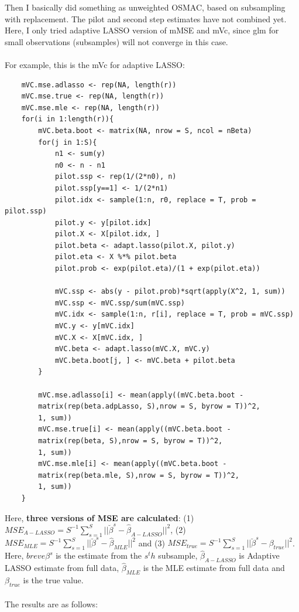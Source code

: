 \documentclass[]{article}
\begin{document}
Then I basically did something as unweighted OSMAC, based on subsampling with replacement. The pilot and second step estimates have not combined yet. Here, I only tried adaptive LASSO version of mMSE and mVc, since glm for small observations (subsamples) will not converge in this case.\\
\\
For example, this is the mVc for adaptive LASSO:\\
\begin{lstlisting}
	mVC.mse.adlasso <- rep(NA, length(r))
	mVC.mse.true <- rep(NA, length(r))
	mVC.mse.mle <- rep(NA, length(r))
	for(i in 1:length(r)){
		mVC.beta.boot <- matrix(NA, nrow = S, ncol = nBeta)
		for(j in 1:S){
			n1 <- sum(y)
			n0 <- n - n1
			pilot.ssp <- rep(1/(2*n0), n)
			pilot.ssp[y==1] <- 1/(2*n1)
			pilot.idx <- sample(1:n, r0, replace = T, prob = pilot.ssp)
			pilot.y <- y[pilot.idx]
			pilot.X <- X[pilot.idx, ]
			pilot.beta <- adapt.lasso(pilot.X, pilot.y)
			pilot.eta <- X %*% pilot.beta
			pilot.prob <- exp(pilot.eta)/(1 + exp(pilot.eta))
			
			mVC.ssp <- abs(y - pilot.prob)*sqrt(apply(X^2, 1, sum))
			mVC.ssp <- mVC.ssp/sum(mVC.ssp)
			mVC.idx <- sample(1:n, r[i], replace = T, prob = mVC.ssp)
			mVC.y <- y[mVC.idx]
			mVC.X <- X[mVC.idx, ]
			mVC.beta <- adapt.lasso(mVC.X, mVC.y)
			mVC.beta.boot[j, ] <- mVC.beta + pilot.beta
		}
		
		mVC.mse.adlasso[i] <- mean(apply((mVC.beta.boot -
		matrix(rep(beta.adpLasso, S),nrow = S, byrow = T))^2,
		1, sum))
		mVC.mse.true[i] <- mean(apply((mVC.beta.boot -
		matrix(rep(beta, S),nrow = S, byrow = T))^2,
		1, sum))
		mVC.mse.mle[i] <- mean(apply((mVC.beta.boot -
		matrix(rep(beta.mle, S),nrow = S, byrow = T))^2,
		1, sum))
	}
\end{lstlisting}
Here, \textbf{three versions of MSE are calculated}: (1) $MSE_{A-LASSO}=S^{-1}\sum_{s=1}^{S}|| \breve{\beta}^{s} - \hat{\beta}_{A-LASSO}||^2$, (2) $MSE_{MLE}=S^{-1}\sum_{s=1}^{S}|| \breve{\beta}^{s} - \hat{\beta}_{MLE}||^2$ and (3) $MSE_{true}=S^{-1}\sum_{s=1}^{S}|| \breve{\beta}^{s} - \beta_{true}||^2$. Here, $breve{\beta}^{s}$ is the estimate from the $s^th$ subsample, $\hat{\beta}_{A-LASSO}$ is Adaptive LASSO estimate from full data, $\hat{\beta}_{MLE}$ is the MLE estimate from full data and $\beta_{true}$ is the true value.\\
\\
The results are as follows:\\
\end{document}
